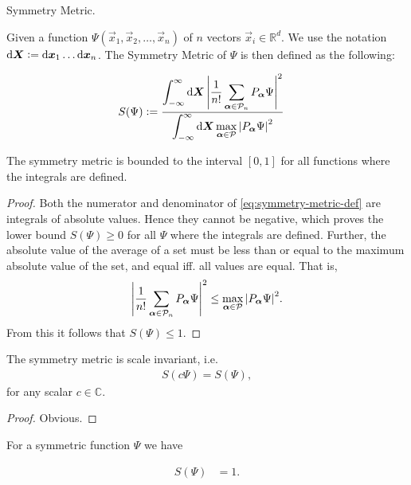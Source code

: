 \documentclass[Thesis.tex]{subfiles}
\begin{document}
\begin{definition}{Symmetry Metric.}

    Given a function $\Psi(\vec x_1, \vec x_2,\dots,\vec x_n)$ of $n$ vectors $\vec
    x_i\in \mathbb{R}^d$. We use the notation $\dd{\bm{X}}\vcentcolon= \dd{\bm{x}_1}\dots\dd{\bm{x}_n}$.
    The Symmetry Metric of $\Psi$ is then defined as the following:

    \begin{align}\label{eq:symmetry-metric-def}
        S(\Psi) &\vcentcolon=  \frac{\displaystyle \int_{-\infty}^{\infty} \dd{\bm{X}}\abs{\frac{1}{n!}
        \sum_{\bm{\alpha}\in \mathcal{P}_n} P_{\bm{\alpha}}\Psi}^2}{\displaystyle \int_{-\infty}^{\infty}\dd{\bm{X}}
        \max_{\bm{\alpha}\in \mathcal{P}} \abs{P_{\bm{\alpha}}\Psi}^2}
    \end{align}
\end{definition}
\begin{corollary}
    The symmetry metric is bounded to the interval $[0, 1]$ for all functions where the integrals are defined.
\end{corollary}
\begin{proof}
    Both the numerator and denominator of \autoref{eq:symmetry-metric-def} are
    integrals of absolute values. Hence they cannot be negative, which proves
    the lower bound $S(\Psi) \geq 0$ for all $\Psi$ where the integrals are defined. Further, the
    absolute value of the average of a set must be less than or equal to the maximum
    absolute value of the set, and equal iff. all values are equal. That is,
    \begin{align}
        \abs{\frac{1}{n!} \sum_{\bm{\alpha}\in \mathcal{P}_n} P_{\bm{\alpha}}\Psi}^2
        \leq \max_{\bm{\alpha}\in \mathcal{P}} \abs{P_{\bm{\alpha}}\Psi}^2.
    \end{align}
    From this it follows that $S(\Psi) \leq 1$.
\end{proof}
\begin{corollary}
   The symmetry metric is scale invariant, i.e.
    \begin{align}
        S(c\Psi) = S(\Psi),
    \end{align}
    for any scalar $c\in \mathbb{C}$.
\end{corollary}
\begin{proof}
   Obvious.
\end{proof}
\begin{corollary}
    For a symmetric function $\Psi$ we have

    \begin{align}
        S(\Psi) &= 1.
    \end{align}
\end{corollary}
\end{document}
